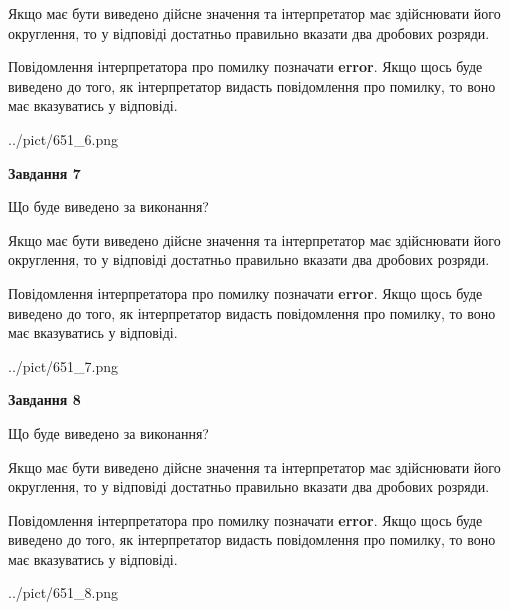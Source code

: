 \documentclass[12pt, ukrainian]{article}
\begin{document}
{\begin {Large}
Якщо має бути виведено дійсне значення та інтерпретатор має здійснювати його округлення, 
то у відповіді достатньо правильно вказати два дробових розряди.

Повідомлення інтерпретатора про помилку позначати \textbf{error}.
Якщо щось буде виведено до того, як інтерпретатор видасть повідомлення про помилку, 
то воно має вказуватись у відповіді. \par

\begin{center}
	{../pict/651_6.png}
\end{center}
\newpage

{\begin {center}\textbf{Завдання 7}\end {center}}\par
Що буде виведено за виконання? \par

Якщо має бути виведено дійсне значення та інтерпретатор має здійснювати його округлення, 
то у відповіді достатньо правильно вказати два дробових розряди.

Повідомлення інтерпретатора про помилку позначати \textbf{error}.
Якщо щось буде виведено до того, як інтерпретатор видасть повідомлення про помилку, 
то воно має вказуватись у відповіді. \par

\begin{center}
	{../pict/651_7.png}
\end{center}
\newpage

{\begin {center}\textbf{Завдання 8}\end {center}}\par
Що буде виведено за виконання? \par

Якщо має бути виведено дійсне значення та інтерпретатор має здійснювати його округлення, 
то у відповіді достатньо правильно вказати два дробових розряди.

Повідомлення інтерпретатора про помилку позначати \textbf{error}.
Якщо щось буде виведено до того, як інтерпретатор видасть повідомлення про помилку, 
то воно має вказуватись у відповіді. \par

\begin{center}
	{../pict/651_8.png}
\end{center}
\newpage


\end{Large}}
\end{document}
